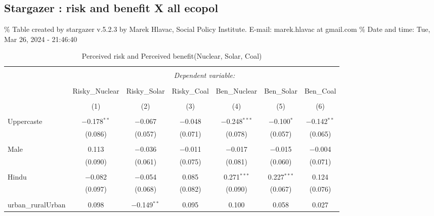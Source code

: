 \documentclass[
]{article}
\begin{document}
\begin{landscape}
\newpage

\hypertarget{stargazer-risk-and-benefit-x-all-ecopol}{%
\subsection{Stargazer : risk and benefit X all
ecopol}\label{stargazer-risk-and-benefit-x-all-ecopol}}

\begingroup\small\setlength{\tabcolsep}{1pt}

\renewcommand{\arraystretch}{0.7}

\% Table created by stargazer v.5.2.3 by Marek Hlavac, Social Policy
Institute. E-mail: marek.hlavac at gmail.com \% Date and time: Tue, Mar
26, 2024 - 21:46:40

\begin{table}[!htbp] \centering 
  \caption{ Perceived risk and Perceived benefit(Nuclear, Solar, Coal)} 
  \label{} 
\begin{tabular}{@{\extracolsep{5pt}}lcccccc} 
\\[-1.8ex]\hline 
\hline \\[-1.8ex] 
 & \multicolumn{6}{c}{\textit{Dependent variable:}} \\ 
\cline{2-7} 
\\[-1.8ex] & Risky\_Nuclear & Risky\_Solar & Risky\_Coal & Ben\_Nuclear & Ben\_Solar & Ben\_Coal \\ 
\\[-1.8ex] & (1) & (2) & (3) & (4) & (5) & (6)\\ 
\hline \\[-1.8ex] 
 Uppercaste & $-$0.178$^{**}$ & $-$0.067 & $-$0.048 & $-$0.248$^{***}$ & $-$0.100$^{*}$ & $-$0.142$^{**}$ \\ 
  & (0.086) & (0.057) & (0.071) & (0.078) & (0.057) & (0.065) \\ 
  & & & & & & \\ 
 Male & 0.113 & $-$0.036 & $-$0.011 & $-$0.017 & $-$0.015 & $-$0.004 \\ 
  & (0.090) & (0.061) & (0.075) & (0.081) & (0.060) & (0.071) \\ 
  & & & & & & \\ 
 Hindu & $-$0.082 & $-$0.054 & 0.085 & 0.271$^{***}$ & 0.227$^{***}$ & 0.124 \\ 
  & (0.097) & (0.068) & (0.082) & (0.090) & (0.067) & (0.076) \\ 
  & & & & & & \\ 
 urban\_ruralUrban & 0.098 & $-$0.149$^{**}$ & 0.095 & 0.100 & 0.058 & 0.027 \\ 

\end{tabular}
\end{table}
\end{landscape}
\end{document}
